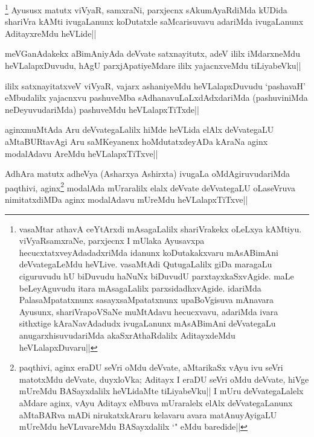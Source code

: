 
\begin{artha}
\footnote[1]{vasaMtar athavA ceYtArxdi mAsagaLalilx shariVrakekx oLeLxya kAMtiyu. viVyaRsamxraNe, parxjecnx I mUlaka Ayusavxpa hecucxtatxveyAdadadxriMda idanunx koDutakakxvaru mAsABimAni deVvategaLeMdu heVLive. vasaMtAdi QutugaLalilx giDa maragaLu ciguruvudu hU biDuvudu haNuNx biDuvudU parxtayxkaSxvAgide. maLe beLeyAguvudu itara mAsagaLalilx parxsidadhxvAgide. idariMda PalasaMpatatxnunx sasayxsaMpatatxnunx upaBoVgisuva mAnavara Ayusunx, shariVrapoVSaNe muMtAdavu hecucxvavu, adariMda ivara sithxtige kAraNavAdadudx ivugaLanunx mAsABimAni deVvategaLu anugarxhisuvudariMda akaSxrAthaRdalilx AditayxdeMdu heVLalapxDuvaru||} Ayususx matutx viVyaR, samxraNi, parxjecnx sAkumAyaRdiMda kUDida shariVra kAMti ivugaLanunx koDutatxle saMcarisuvavu adariMda ivugaLanunx AditayxreMdu heVLide||
\end{artha}


\begin{artha}
meVGanAdakekx aBimAniyAda deVvate satxnayitutx, adeV ililx iMdarxneMdu heVLalapxDuvudu, hAgU parxjApatiyeMdare ililx yajacnxveMdu tiLiyabeVku||
\end{artha}


\begin{artha}
ililx satxnayitatxveV viVyaR, vajarx ashaniyeMdu heVLalapxDuvudu `pashavaH' eMbudalilx yajacnxvu pashuveMba sAdhanavuLaLxdAdxdariMda (pashuviniMda neDeyuvudariMda) pashuveMdu heVLalapxTiTxde||
\end{artha}


\begin{artha}
aginxmuMtAda Aru deVvategaLalilx hiMde heVLida elAlx deVvategaLU aMtaBURtavAgi Aru saMKeyanenx hoMdutatxdeyADa kAraNa aginx modalAdavu AreMdu heVLalapxTiTxve||
\end{artha}


\begin{artha}
AdhAra matutx adheVya (Asharxya Ashirxta) ivugaLa oMdAgiruvudariMda paqthivi, aginx\footnote[1]{paqthivi, aginx eraDU seVri oMdu deVvate, aMtarikaSx vAyu ivu seVri matotxMdu deVvate, duyxloVka; Aditayx I eraDU seVri oMdu deVvate, hiVge mUreMdu BASayxdalilx heVLidaMte tiLiyabeVku|| I mUru deVvategaLalelx aMdare aginx, vAyu Aditayx eMbuva mUraralelx elAlx deVvategaLanunx aMtaBARva mADi nirukatxkAraru kelavaru avara matAnuyAyigaLU mUreMdu heVLuvareMdu BASayxdalilx `\stext " eMdu baredide||} modalAda mUraralilx elalx deVvate deVvategaLU oLaseVruva nimitatxdiMDa aginx modalAdavu mUreMdu heVLalapxTiTxve||
\end{artha}


